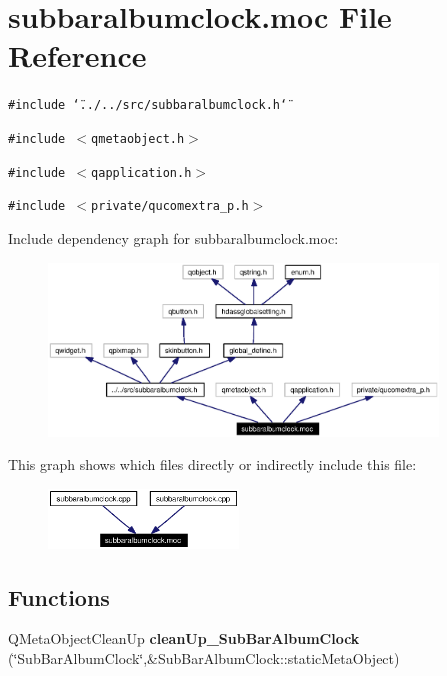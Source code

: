 \section{subbaralbumclock.moc File Reference}
\label{subbaralbumclock_8moc}


{\tt \#include \char`\"{}../../src/subbaralbumclock.h\char`\"{}}\par
{\tt \#include $<$qmetaobject.h$>$}\par
{\tt \#include $<$qapplication.h$>$}\par
{\tt \#include $<$private/qucomextra\_\-p.h$>$}\par


Include dependency graph for subbaralbumclock.moc:\begin{figure}[H]
\begin{center}
\leavevmode
\includegraphics[width=293pt]{subbaralbumclock_8moc__incl}
\end{center}
\end{figure}


This graph shows which files directly or indirectly include this file:\begin{figure}[H]
\begin{center}
\leavevmode
\includegraphics[width=143pt]{subbaralbumclock_8moc__dep__incl}
\end{center}
\end{figure}
\subsection*{Functions}
\begin{CompactItemize}
\item 
QMeta\-Object\-Clean\-Up {\bf clean\-Up\_\-Sub\-Bar\-Album\-Clock} (\char`\"{}Sub\-Bar\-Album\-Clock\char`\"{},\&Sub\-Bar\-Album\-Clock::static\-Meta\-Object)
\end{CompactItemize}


